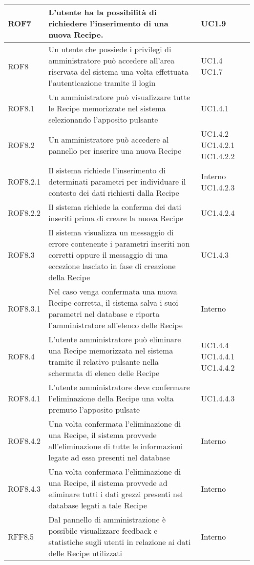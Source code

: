\begin{center}
\begin{longtable}{| p{2cm} | p{8cm} | p{2cm} |}
		ROF7  & L'utente ha la possibilità di richiedere l'inserimento di una nuova Recipe. & UC1.9 \\
		\hline








		ROF8  &  Un utente che possiede i privilegi di amministratore può accedere all'area riservata del sistema una volta effettuata l'autenticazione tramite il login  &  UC1.4 \newline UC1.7 \\
		\hline
		ROF8.1  &  Un amministratore può visualizzare tutte le Recipe memorizzate nel sistema selezionando l'apposito pulsante  &  UC1.4.1 \\
		\hline
		ROF8.2  &  Un amministratore può accedere al pannello per inserire una nuova Recipe  &  UC1.4.2 \newline UC1.4.2.1 \newline UC1.4.2.2  \\
		\hline
		ROF8.2.1  &  Il sistema richiede l'inserimento di determinati parametri per individuare il contesto dei dati richiesti dalla Recipe  &  Interno \newline UC1.4.2.3 \\
		\hline
		ROF8.2.2  &  Il sistema richiede la conferma dei dati inseriti prima di creare la nuova Recipe  &  UC1.4.2.4 \\
		\hline
		ROF8.3  &  Il sistema visualizza un messaggio di errore contenente i parametri inseriti non corretti oppure il messaggio di una eccezione lasciato in fase di creazione della Recipe  &  UC1.4.3 \\
		\hline
		ROF8.3.1  &  Nel caso venga confermata  una nuova Recipe corretta, il sistema salva i suoi parametri nel database  e riporta l'amministratore all'elenco delle Recipe  &  Interno \\
		\hline
		ROF8.4  &  L'utente amministratore può eliminare una Recipe memorizzata nel sistema tramite il relativo pulsante nella schermata di elenco delle Recipe  &  UC1.4.4 \newline UC1.4.4.1 \newline UC1.4.4.2 \\
		\hline
		ROF8.4.1  &  L'utente amministratore deve confermare l'eliminazione della Recipe una volta premuto l'apposito pulsate  &  UC1.4.4.3 \\
		\hline
		ROF8.4.2  &  Una volta confermata l'eliminazione di una Recipe, il sistema provvede all'eliminazione di tutte le informazioni legate ad essa presenti nel database  &  Interno \\
		\hline
		ROF8.4.3  &  Una volta confermata l'eliminazione di una Recipe, il sistema provvede ad eliminare tutti i dati grezzi presenti nel database legati a tale Recipe  &  Interno \\
		\hline
		RFF8.5  &  Dal pannello di amministrazione è possibile visualizzare feedback e statistiche sugli utenti in relazione ai dati delle Recipe utilizzati  &  Interno \\
		\hline



\end{longtable}
\end{center}
